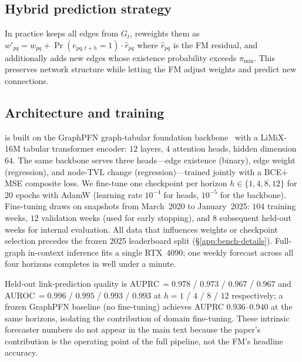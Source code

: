 \subsection{Hybrid prediction strategy}
In practice \fmname{} keeps all edges from $G_t$, reweights them as
$w'_{pq}\!=\!w_{pq} + \Pr(e_{pq,t+h}\!=\!1)\cdot\widehat{r}_{pq}$
where $\widehat{r}_{pq}$ is the FM residual, and additionally adds
new edges whose existence probability exceeds $\pi_{\min}$. This
preserves network structure while letting the FM adjust weights and
predict new connections.

\subsection{Architecture and training}
\label{ssec:fm-spec}
\fmname{} is built on the GraphPFN graph-tabular foundation
backbone~\citep{HollmannEtAl2025TabPFN,
eremeev2025turningtabularfoundationmodels} with a LiMiX-16M tabular
transformer encoder: $12$ layers, $4$ attention heads, hidden
dimension $64$. The same backbone serves three heads---edge
existence (binary), edge weight (regression), and node-TVL change
(regression)---trained jointly with a BCE$+$MSE composite loss. We
fine-tune one checkpoint per horizon $h\!\in\!\{1,4,8,12\}$ for
$20$ epochs with AdamW (learning rate $10^{-4}$ for heads,
$10^{-5}$ for the backbone). Fine-tuning draws on \corpusname{}
snapshots from March~2020 to January~2025: $104$ training weeks,
$12$ validation weeks (used for early stopping), and $8$ subsequent
held-out weeks for internal evaluation. All data that influences
weights or checkpoint selection precedes the frozen 2025
leaderboard split (\S\ref{app:bench-details}). Full-graph
in-context inference fits a single RTX~4090; one weekly forecast
across all four horizons completes in well under a minute.

Held-out link-prediction quality is
AUPRC$\,=\!0.978$ / $0.973$ / $0.967$ / $0.967$ and
AUROC$\,=\!0.996$ / $0.995$ / $0.993$ / $0.993$ at $h\!=\!1$ / $4$
/ $8$ / $12$ respectively; a frozen GraphPFN baseline (no
fine-tuning) achieves AUPRC $0.936$--$0.940$ at the same horizons,
isolating the contribution of domain fine-tuning. These intrinsic
forecaster numbers do not appear in the main text because the
paper's contribution is the operating point of the full pipeline,
not the FM's headline accuracy.
